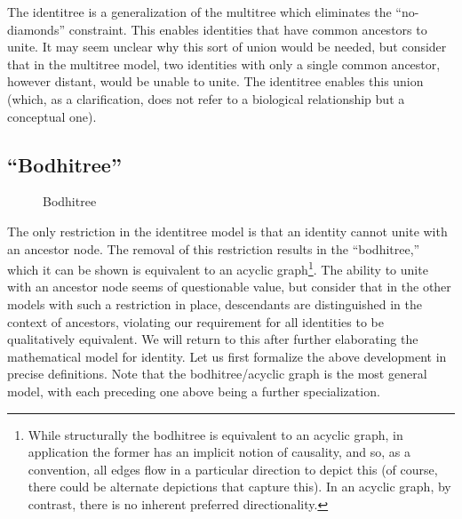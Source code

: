 \documentclass[pra,twocolumn,groupedaddress,10pt]{revtex4}
\theoremstyle{definition}
\begin{document}
The identitree is a generalization of the multitree which eliminates the ``no-diamonds'' constraint. This enables identities that have common ancestors to unite. It may seem unclear why this sort of union would be needed, but consider that in the multitree model, two identities with only a single common ancestor, however distant, would be unable to unite. The identitree enables this union (which, as a clarification, does not refer to a biological relationship but a conceptual one).

\subsection{``Bodhitree''} \label{sec:bodhitree}

\begin{figure}[htp]
\centering
{}
\caption{\label{fig:bodhitree}Bodhitree}
\end{figure}

The only restriction in the identitree model is that an identity cannot unite with an ancestor node. The removal of this restriction results in the ``bodhitree,'' which it can be shown is equivalent to an acyclic graph\footnote{While structurally the bodhitree is equivalent to an acyclic graph, in application the former has an implicit notion of causality, and so, as a convention, all edges flow in a particular direction to depict this (of course, there could be alternate depictions that capture this). In an acyclic graph, by contrast, there is no inherent preferred directionality.}. The ability to unite with an ancestor node seems of questionable value, but consider that in the other models with such a restriction in place, descendants are distinguished in the context of ancestors, violating our requirement for all identities to be qualitatively equivalent. We will return to this after further elaborating the mathematical model for identity. Let us first formalize the above development in precise definitions. Note that the bodhitree/acyclic graph is the most general model, with each preceding one above being a further specialization.
\end{document}
